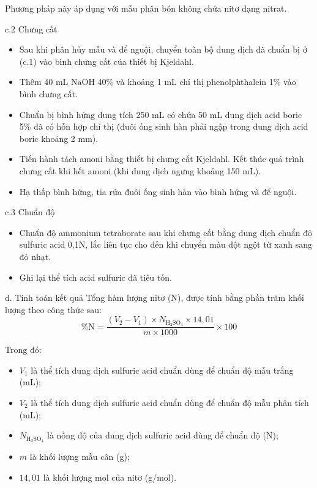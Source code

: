 Phương pháp này áp dụng với mẫu phân bón không chứa nitơ dạng nitrat.

c.2 Chưng cất

\begin{itemize}
  \item Sau khi phân hủy mẫu và để nguội, chuyển toàn bộ dung dịch đã chuẩn bị ở (c.1) vào bình chưng cất  của thiết bị Kjeldahl.
  \item Thêm 40 mL \(\mathrm{NaOH}\) 40\% và khoảng 1 mL chỉ thị phenolphthalein 1\% vào bình chưng cất.
  \item Chuẩn bị bình hứng dung tích 250 mL có chứa 50 mL dung dịch acid boric 5\% đã có hỗn hợp chỉ thị (đuôi ống sinh hàn phải ngập trong dung dịch acid boric khoảng 2 mm).
  \item Tiến hành tách amoni bằng thiết bị chưng cất Kjeldahl. Kết thúc quá trình chưng cất khi hết amoni (khi dung dịch ngưng khoảng 150 mL).
  \item Hạ thấp bình hứng, tia rửa đuôi ống sinh hàn vào bình hứng và để nguội.
\end{itemize}

c.3 Chuẩn độ

\begin{itemize}
  \item Chuẩn độ ammonium tetraborate sau khi chưng cất bằng dung dịch chuẩn độ sulfuric acid 0,1N, lắc liên tục cho đến khi chuyển màu đột ngột từ xanh sang đỏ nhạt. 
  \item Ghi lại thể tích acid sulfuric đã tiêu tốn.
\end{itemize}

d. Tính toán kết quả
Tổng hàm lượng nitơ (N), được tính bằng phần trăm khối lượng theo công thức sau:
\[
  \%\mathrm{N} = \frac{(V_2 - V_1) \times N_{\mathrm{H_2SO_4}} \times 14{,}01}{m \times 1000} \times 100
\]

Trong đó:
\begin{itemize}
  \item $V_1$ là thể tích dung dịch sulfuric acid chuẩn dùng để chuẩn độ mẫu trắng (mL);
  \item $V_2$ là thể tích dung dịch sulfuric acid chuẩn dùng để chuẩn độ mẫu phân tích (mL);
  \item $N_{\mathrm{H_2SO_4}}$ là nồng độ của dung dịch sulfuric acid dùng để chuẩn độ (N);
  \item $m$ là khối lượng mẫu cân (g);
  \item $14{,}01$ là khối lượng mol của nitơ (g/mol).
\end{itemize}

